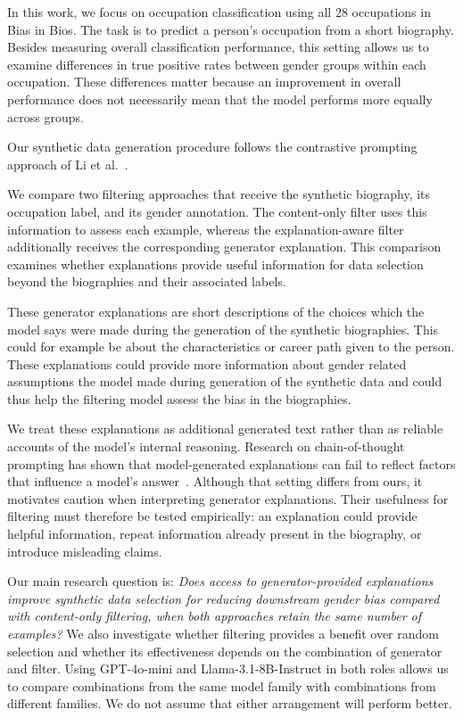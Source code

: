 \documentclass[sigconf]{acmart}
\begin{document}
In this work, we focus on occupation classification using all 28 occupations in Bias in Bios. The task is to predict a person's occupation from a short biography. Besides measuring overall classification performance, this setting allows us to examine differences in true positive rates between gender groups within each occupation. These differences matter because an improvement in overall performance does not necessarily mean that the model performs more equally across groups.

Our synthetic data generation procedure follows the contrastive prompting approach of Li et al.~\cite{li2026inheritance}.

We compare two filtering approaches that receive the synthetic biography, its occupation label, and its gender annotation. The content-only filter uses this information to assess each example, whereas the explanation-aware filter additionally receives the corresponding generator explanation. This comparison examines whether explanations provide useful information for data selection beyond the biographies and their associated labels.

These generator explanations are short descriptions of the choices which the model says were made during the generation of the synthetic biographies. This could for example be about the characteristics or career path given to the person. These explanations could provide more information about gender related assumptions the model made during generation of the synthetic data and could thus help the filtering model assess the bias in the biographies.

We treat these explanations as additional generated text rather than as reliable accounts of the model's internal reasoning. Research on chain-of-thought prompting has shown that model-generated explanations can fail to reflect factors that influence a model's answer~\cite{turpin2023unfaithful}. Although that setting differs from ours, it motivates caution when interpreting generator explanations. Their usefulness for filtering must therefore be tested empirically: an explanation could provide helpful information, repeat information already present in the biography, or introduce misleading claims.

Our main research question is: \emph{Does access to generator-provided explanations improve synthetic data selection for reducing downstream gender bias compared with content-only filtering, when both approaches retain the same number of examples?} We also investigate whether filtering provides a benefit over random selection and whether its effectiveness depends on the combination of generator and filter. Using GPT-4o-mini and Llama-3.1-8B-Instruct in both roles allows us to compare combinations from the same model family with combinations from different families. We do not assume that either arrangement will perform better.
\end{document}
